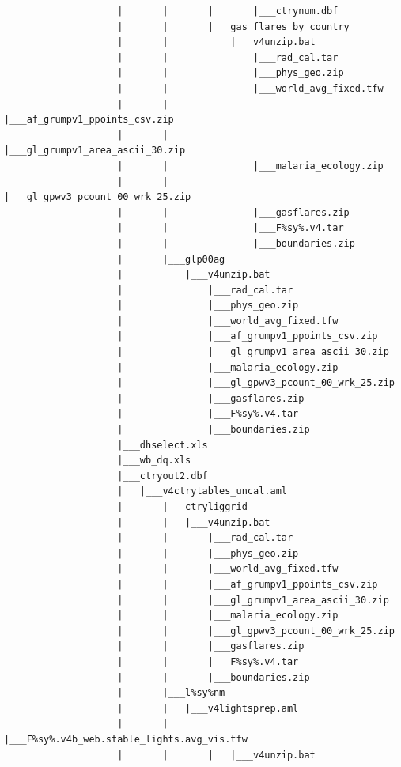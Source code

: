 \documentclass[]{book}
\begin{document}
\begin{verbatim}
                    |       |       |       |___ctrynum.dbf
                    |       |       |___gas flares by country
                    |       |           |___v4unzip.bat
                    |       |               |___rad_cal.tar
                    |       |               |___phys_geo.zip
                    |       |               |___world_avg_fixed.tfw
                    |       |               |___af_grumpv1_ppoints_csv.zip
                    |       |               |___gl_grumpv1_area_ascii_30.zip
                    |       |               |___malaria_ecology.zip
                    |       |               |___gl_gpwv3_pcount_00_wrk_25.zip
                    |       |               |___gasflares.zip
                    |       |               |___F%sy%.v4.tar
                    |       |               |___boundaries.zip
                    |       |___glp00ag
                    |           |___v4unzip.bat
                    |               |___rad_cal.tar
                    |               |___phys_geo.zip
                    |               |___world_avg_fixed.tfw
                    |               |___af_grumpv1_ppoints_csv.zip
                    |               |___gl_grumpv1_area_ascii_30.zip
                    |               |___malaria_ecology.zip
                    |               |___gl_gpwv3_pcount_00_wrk_25.zip
                    |               |___gasflares.zip
                    |               |___F%sy%.v4.tar
                    |               |___boundaries.zip
                    |___dhselect.xls
                    |___wb_dq.xls
                    |___ctryout2.dbf
                    |   |___v4ctrytables_uncal.aml
                    |       |___ctryliggrid
                    |       |   |___v4unzip.bat
                    |       |       |___rad_cal.tar
                    |       |       |___phys_geo.zip
                    |       |       |___world_avg_fixed.tfw
                    |       |       |___af_grumpv1_ppoints_csv.zip
                    |       |       |___gl_grumpv1_area_ascii_30.zip
                    |       |       |___malaria_ecology.zip
                    |       |       |___gl_gpwv3_pcount_00_wrk_25.zip
                    |       |       |___gasflares.zip
                    |       |       |___F%sy%.v4.tar
                    |       |       |___boundaries.zip
                    |       |___l%sy%nm
                    |       |   |___v4lightsprep.aml
                    |       |       |___F%sy%.v4b_web.stable_lights.avg_vis.tfw
                    |       |       |   |___v4unzip.bat

\end{verbatim}
\end{document}
